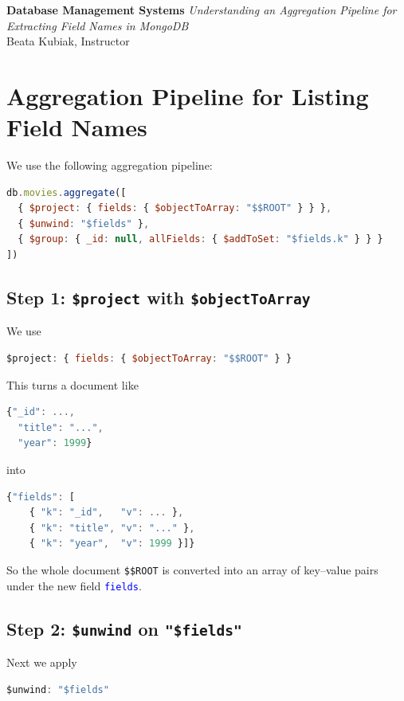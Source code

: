 \documentclass[9pt]{article}
\begin{document}
\noindent
\textbf{Database Management Systems}%
\hfill%
\textit{Understanding an Aggregation Pipeline for Extracting Field Names in MongoDB}\\
Beata Kubiak, Instructor

\medskip

\section*{Aggregation Pipeline for Listing Field Names}

\noindent
We use the following aggregation pipeline:
\begin{lstlisting}[language=JavaScript]
db.movies.aggregate([
  { $project: { fields: { $objectToArray: "$$ROOT" } } },
  { $unwind: "$fields" },
  { $group: { _id: null, allFields: { $addToSet: "$fields.k" } } }
])
\end{lstlisting}

\subsection*{Step 1: \texttt{\$project} with \texttt{\$objectToArray}}

We use
\begin{lstlisting}[language=JavaScript]
$project: { fields: { $objectToArray: "$$ROOT" } }
\end{lstlisting}

This turns a document like
\begin{lstlisting}[language=JavaScript]
{"_id": ...,
  "title": "...",
  "year": 1999}
\end{lstlisting}

into
\begin{lstlisting}[language=JavaScript]
{"fields": [
    { "k": "_id",   "v": ... },
    { "k": "title", "v": "..." },
    { "k": "year",  "v": 1999 }]}
\end{lstlisting}

So the whole document \texttt{\$\$ROOT} is converted into an array of
key--value pairs under the new field \texttt{\textcolor{blue}{fields}}.

\subsection*{Step 2: \texttt{\$unwind} on \texttt{"\$fields"}}

Next we apply
\begin{lstlisting}[language=JavaScript]
$unwind: "$fields"
\end{lstlisting}
\end{document}
